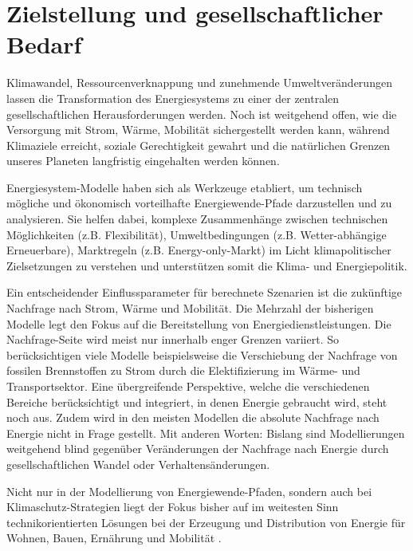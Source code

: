 \documentclass[a4paper,11pt,twoside]{scrartcl}
\begin{document}
\onehalfspacing

\clearpage


{\singlespacing

}

\setcounter{page}{1}

\section{Zielstellung und gesellschaftlicher Bedarf}
\label{sec:ziel}

Klimawandel, Ressourcenverknappung und zunehmende Umweltveränderungen lassen die Transformation des Energiesystems zu einer der zentralen gesellschaftlichen Herausforderungen werden. Noch ist weitgehend offen, wie die Versorgung mit Strom, Wärme, Mobilität sichergestellt werden kann, während Klimaziele erreicht, soziale Gerechtigkeit gewahrt und die natürlichen Grenzen unseres Planeten langfristig eingehalten werden können. 

Energiesystem-Modelle haben sich als Werkzeuge etabliert, um technisch mögliche und ökonomisch vorteilhafte Energiewende-Pfade darzustellen und zu analysieren. Sie helfen dabei, komplexe Zusammenhänge zwischen technischen Möglichkeiten (z.B. Flexibilität), Umweltbedingungen (z.B. Wetter-abhängige Erneuerbare), Marktregeln (z.B. Energy-only-Markt) im Licht klimapolitischer Zielsetzungen zu verstehen und unterstützen somit die Klima- und Energiepolitik.

Ein entscheidender Einflussparameter für berechnete Szenarien ist die zukünftige Nachfrage nach Strom, Wärme und Mobilität. Die Mehrzahl der bisherigen Modelle legt den Fokus  auf die Bereitstellung von Energiedienstleistungen. Die Nachfrage-Seite wird meist nur innerhalb enger Grenzen variiert. So berücksichtigen viele Modelle beispielsweise die Verschiebung der Nachfrage von fossilen Brennstoffen zu Strom durch die Elektifizierung im Wärme- und Transportsektor. Eine übergreifende Perspektive, welche die verschiedenen Bereiche berücksichtigt und integriert, in denen Energie gebraucht wird, steht noch aus. Zudem wird in den meisten Modellen die absolute Nachfrage nach Energie nicht in Frage gestellt. Mit anderen Worten: Bislang sind Modellierungen weitgehend blind gegenüber Veränderungen der Nachfrage nach Energie durch gesellschaftlichen Wandel oder Verhaltensänderungen.

Nicht nur in der Modellierung von Energiewende-Pfaden, sondern auch  bei Klimaschutz-Strategien liegt der Fokus bisher auf im weitesten Sinn technikorientierten Lösungen bei der Erzeugung und Distribution von Energie für Wohnen, Bauen, Ernährung und Mobilität \cite{Creutzig2018}. 
\end{document}
